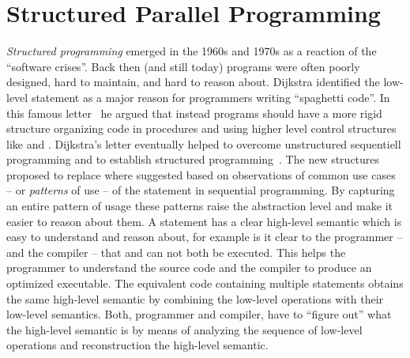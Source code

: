 \section{Structured Parallel Programming}
\emph{Structured programming} emerged in the 1960s and 1970s as a reaction of the ``software crises''.
Back then (and still today) programs were often poorly designed, hard to maintain, and hard to reason about.
Dijkstra identified the low-level  statement as a major reason for programmers writing ``spaghetti code''.
In this famous letter~\cite{} he argued that instead programs should have a more rigid structure organizing code in procedures and using higher level control structures like  and .
Dijkstra's letter eventually helped to overcome unstructured sequentiell programming and to establish structured programming~\cite{}.
The new structures proposed to replace  where suggested based on observations of common use cases -- or \emph{patterns} of use -- of the  statement in sequential programming.
By capturing an entire pattern of usage these patterns raise the abstraction level and make it easier to reason about them.
A  statement has a clear high-level semantic which is easy to understand and reason about, for example is it clear to the programmer -- and the compiler -- that  and  can not both be executed.
This helps the programmer to understand the source code and the compiler to produce an optimized executable.
The equivalent code containing multiple  statements obtains the same high-level semantic by combining the low-level operations with their low-level semantics.
Both, programmer and compiler, have to ``figure out'' what the high-level semantic is by means of analyzing the sequence of low-level operations and reconstruction the high-level semantic.

